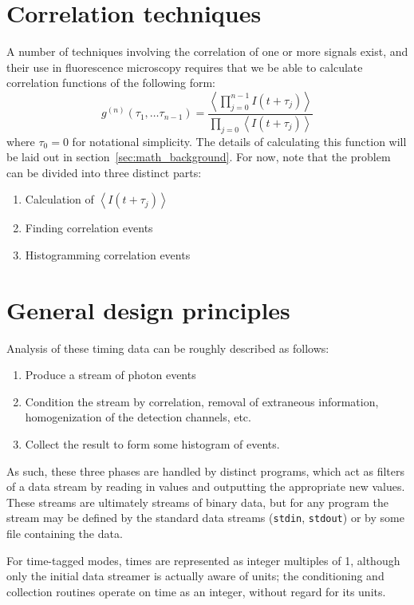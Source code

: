 \documentclass{book}
\newcommand{\angles}[1]{\ensuremath{\left\langle #1 \right\rangle}}
\newcommand{\stdin}{\texttt{stdin}}
\newcommand{\stdout}{\texttt{stdout}}
\newcommand{\gn}[1]{\ensuremath{g^{(#1)}}}
\newcommand{\timedelay}{\ensuremath{\tau}}
\renewcommand{\time}{\ensuremath{t}}
\newcommand{\intensity}{\ensuremath{I}}
\numberwithin{equation}{section}
\numberwithin{figure}{section}
\begin{document}
\section{Correlation techniques}
A number of techniques involving the correlation of one or more signals exist, and their use in fluorescence microscopy requires that we be able to calculate correlation functions of the following form:
\begin{equation}
\gn{n}(\timedelay_{1}, \ldots \timedelay_{n-1}) = 
    \frac{\angles{\prod_{j=0}^{n-1}{\intensity(\time+\timedelay_{j})}}}
	     {\prod_{j=0}{\angles{\intensity(\time+\timedelay_{j})}}}
\end{equation}
where $\timedelay_{0}=0$ for notational simplicity. The details of calculating this function will be laid out in section~\ref{sec:math_background}. For now, note that the problem can be divided into three distinct parts:
\begin{enumerate}
\item Calculation of \angles{\intensity(\time+\timedelay_{j})}
\item Finding correlation events
\item Histogramming correlation events
\end{enumerate}

\section{General design principles}
Analysis of these timing data can be roughly described as follows:
\begin{enumerate}
\item Produce a stream of photon events
\item Condition the stream by correlation, removal of extraneous information, homogenization of the detection channels, etc.
\item Collect the result to form some histogram of events.
\end{enumerate}
As such, these three phases are handled by distinct programs, which act as filters of a data stream by reading in values and outputting the appropriate new values. These streams are ultimately streams of binary data, but for any program the stream may be defined by the standard data streams (\stdin, \stdout) or by some file containing the data. 

For time-tagged modes, times are represented as integer multiples of 1\pico\second, although only the initial data streamer is actually aware of units; the conditioning and collection routines operate on time as an integer, without regard for its units.
\end{document}
